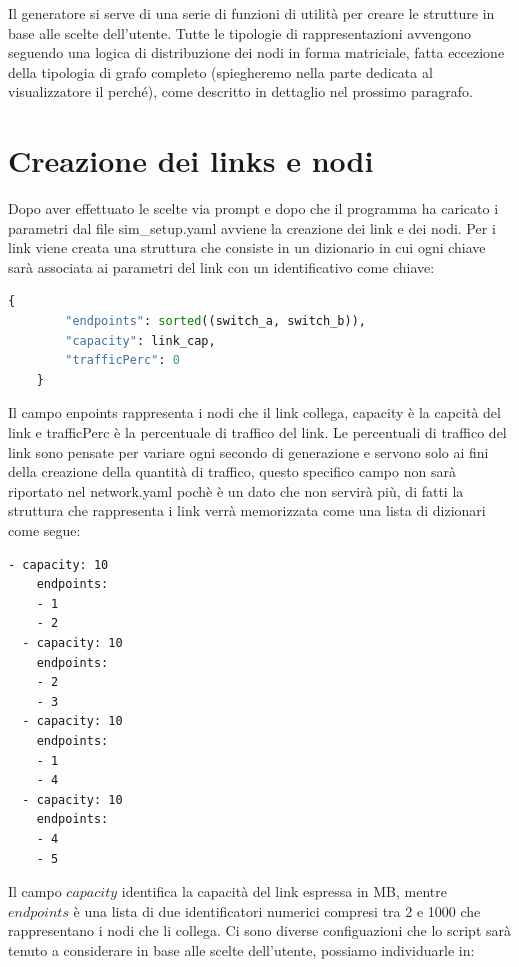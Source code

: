 \documentclass[binding=0.6cm]{sapthesis}
\begin{document}
Il generatore si serve di una serie di funzioni di utilità per creare le strutture in base alle scelte dell'utente. 
Tutte le tipologie di rappresentazioni avvengono seguendo una logica di distribuzione dei nodi in forma matriciale, fatta eccezione della tipologia di
grafo completo (spiegheremo nella parte dedicata al visualizzatore il perché), come descritto in dettaglio nel prossimo paragrafo.


\section{Creazione dei links e nodi}
\label{sec:creazione_links_nodi}
Dopo aver effettuato le scelte via prompt e dopo che il programma ha caricato i parametri dal file sim\_setup.yaml 
avviene la creazione dei link e dei nodi. Per i link viene creata una struttura che consiste in un dizionario in cui ogni chiave sarà associata
ai parametri del link con un identificativo come chiave:

{\scriptsize %
\begin{lstlisting}[language=Python, caption={Esempio di rappresentazione di un link}, label={codice:links_key_value}]
    {
        "endpoints": sorted((switch_a, switch_b)),
        "capacity": link_cap,
        "trafficPerc": 0
    }
\end{lstlisting}
}
Il campo enpoints rappresenta i nodi che il link collega, capacity è la capcità del link e trafficPerc è la percentuale di traffico del link.
Le percentuali di traffico del link sono pensate per variare ogni secondo di generazione e servono solo ai fini della creazione della quantità di traffico, questo specifico campo non sarà riportato nel network.yaml
pochè è un dato che non servirà più, di fatti la struttura che rappresenta i link verrà memorizzata come una lista di dizionari come segue:


{\scriptsize %
\begin{lstlisting}[caption={Esempio di struttura finale dei links}, label={codice:links_structure}]
  - capacity: 10
    endpoints:
    - 1
    - 2
  - capacity: 10
    endpoints:
    - 2
    - 3
  - capacity: 10
    endpoints:
    - 1
    - 4
  - capacity: 10
    endpoints:
    - 4
    - 5
\end{lstlisting}
}

Il campo \(capacity\) identifica la capacità del link espressa in MB, mentre \(endpoints\) è una lista di due identificatori numerici compresi tra
2 e 1000 che rappresentano i nodi che li collega.
Ci sono diverse configuazioni che lo script sarà tenuto a considerare in base alle scelte dell'utente, possiamo individuarle in:
\end{document}
